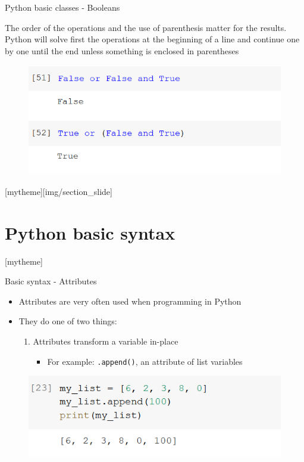 \documentclass[aspectratio=169]{beamer}
\newcommand{\sectionpic}[2]{
	\setbeamertemplate{section page}[mytheme][#2]
	\section{#1}
	\setbeamertemplate{section page}[mytheme]
}
\begin{document}
\begin{frame}{Python basic classes - Booleans}

	The order of the operations and the use of parenthesis matter for the results. Python will solve first the operations at the beginning of a line and continue one by one until the end unless something is enclosed in parentheses

	\begin{figure}
		\centering
		\includegraphics[width=0.6\linewidth]{img/bool_operations.png}
	\end{figure}

\end{frame}

\sectionpic{Python basic syntax}{img/section_slide}


\begin{frame}{Basic syntax - Attributes}

	\begin{itemize}
		\item Attributes are very often used when programming in Python
		\item They do one of two things:
			\begin{enumerate}
				\item Attributes transform a variable in-place
				\begin{itemize}
					\item For example: \texttt{.append()}, an attribute of list variables
				\end{itemize}
			\end{enumerate}
	\end{itemize}

	\begin{figure}
		\centering
		\includegraphics[width=0.6\linewidth]{img/attributes_append.png}
	\end{figure}

\end{frame}
\end{document}

